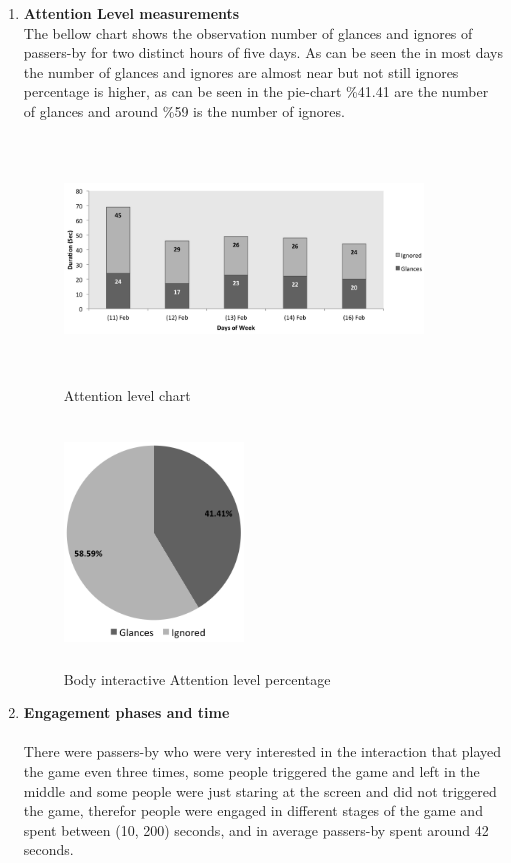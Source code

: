 \begin{enumerate}
\item \textbf{Attention Level measurements} \\
The bellow chart shows the observation number of glances and ignores of passers-by for two distinct hours of five days. As can be seen the in most days the number of glances and ignores are almost near but not still ignores percentage is higher, as can be seen in the pie-chart \%41.41 are the number of glances and around \%59 is the number of ignores. 
\begin{figure}[H]
    \centering
    \includegraphics[width=0.9\textwidth,height=6.5cm]{Figures/8/body_inter_findings/Body_Inter_chart}%
    \caption{Attention level chart}%
    \label{fig:bodyattentionlevelchart}%
\end{figure}


\begin{figure}[H]
    \centering
    \includegraphics[width=0.45\textwidth,height=6.5cm]{Figures/8/body_inter_findings/body_inter_percentage}
    \caption{Body interactive Attention level percentage}%
    \label{fig:bodyattentionlevelpercentage}%
\end{figure}



\item \textbf{Engagement phases and time} \\
\\
There were passers-by who were very interested in the interaction that played the game even three times, some people triggered the game and left in the middle and some people were just staring at the screen and did not triggered the game, therefor people were engaged in different stages of the game and spent between (10, 200) seconds, and in average passers-by spent around 42 seconds.


\end{enumerate}
